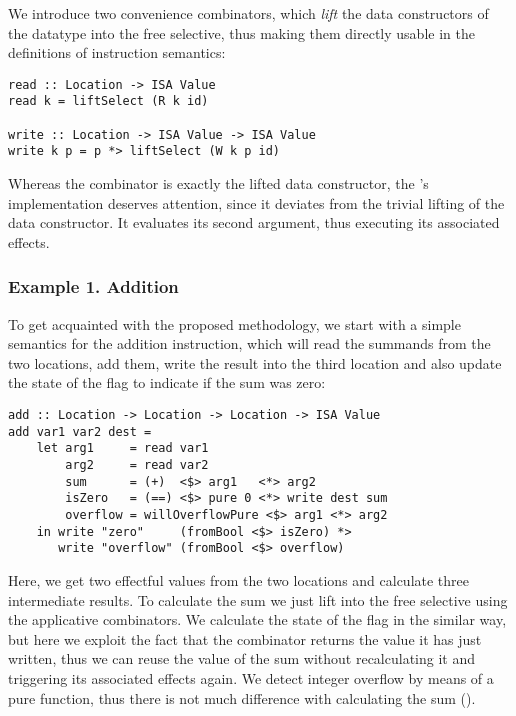 We introduce two convenience combinators, which \emph{lift} the data constructors
of the  datatype into the free selective, thus making them directly usable in
the definitions of instruction semantics:

\begin{verbatim}
read :: Location -> ISA Value
read k = liftSelect (R k id)

write :: Location -> ISA Value -> ISA Value
write k p = p *> liftSelect (W k p id)
\end{verbatim}

Whereas the  combinator is exactly the lifted  data constructor, the 's implementation deserves attention, since it deviates from the trivial lifting of
the  data constructor. It evaluates its second argument, thus executing its
associated effects.

\subsubsection{Example 1. Addition}

To get acquainted with the proposed methodology, we start with a simple semantics for
the addition instruction, which will read the summands from the two locations, add them,
write the result into the third location and also update the state of the 
flag to indicate if the sum was zero:

\begin{verbatim}
add :: Location -> Location -> Location -> ISA Value
add var1 var2 dest =
    let arg1     = read var1
        arg2     = read var2
        sum      = (+)  <$> arg1   <*> arg2
        isZero   = (==) <$> pure 0 <*> write dest sum
        overflow = willOverflowPure <$> arg1 <*> arg2
    in write "zero"     (fromBool <$> isZero) *>
       write "overflow" (fromBool <$> overflow)
\end{verbatim}

Here, we get two effectful values from the two locations and calculate three intermediate
results. To calculate the sum we just lift \hs{+} into the free selective using the applicative
combinators. We calculate the state of the  flag in the similar way, but here we
exploit the fact that the  combinator returns the value it has just written, thus we
can reuse the value of the sum without recalculating it and triggering its associated effects
again. We detect integer overflow by means of a pure function, thus there is not much difference
with calculating the sum ().

